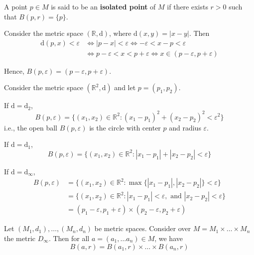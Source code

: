 \begin{definition}
	A point $p \in M$ is said to be an \textbf{isolated point} of $M$ if there exists $r > 0$ such that $B(p,r) = \{ p \}$.
\end{definition}

\begin{example}
	Consider the metric space $(\mathbb{R}, \mathrm{d})$, where $\mathrm{d}(x,y) = | x - y | $. Then
	\begin{equation*}
		\begin{aligned}
			\mathrm{d}(p,x) < \varepsilon &\iff |p-x| < \varepsilon \iff -\varepsilon < x - p < \varepsilon \\
			&\iff p - \varepsilon < x < p + \varepsilon \iff x \in (p-\varepsilon, p+\varepsilon)
		\end{aligned}
	\end{equation*}
	
	Hence, $B(p, \varepsilon) = (p - \varepsilon, p + \varepsilon)$.
\end{example}

\begin{example}
	Consider the metric space $(\mathbb{R}^2, \mathrm{d})$ and let $p = (p_1, p_2)$.
	
	If $\mathrm{d} = \mathrm{d}_2$,
	\[
		B(p, \varepsilon) = \{ (x_1, x_2) \in \mathbb{R}^2 : (x_1 - p_1)^2 + (x_2 - p_2)^2 < \varepsilon^2 \}
	\]
	i.e., the open ball $B(p, \varepsilon)$ is the circle with center $p$ and radius $\varepsilon$.
	
	If $\mathrm{d} = \mathrm{d}_1$,
	\[
		B(p, \varepsilon) = \{ (x_1, x_2) \in \mathbb{R}^2 : |x_1 - p_1| + |x_2 - p_2| < \varepsilon \}
	\]
	
	If $\mathrm{d} = \mathrm{d}_\infty$,
	\begin{equation*}
		\begin{aligned}
		B(p, \varepsilon) &= \{ (x_1, x_2) \in \mathbb{R}^2 : \max \{ |x_1 - p_1|, |x_2 - p_2| \} < \varepsilon \} \\
		&= \{ (x_1, x_2) \in \mathbb{R}^2 : |x_1 - p_1| < \varepsilon, \text{ and } |x_2 - p_2| < \varepsilon \} \\
		&= (p_1 - \varepsilon, p_1 + \varepsilon) \times (p_2 - \varepsilon, p_2 + \varepsilon)
		\end{aligned}
	\end{equation*}
\end{example}

\begin{proposition}
	Let $(M_1, d_1), \ldots, (M_n, d_n)$ be metric spaces. Consider over $M = M_1 \times \ldots \times M_n$ the metric $D_\infty$. Then for all $a = (a_1, \ldots a_n) \in M$, we have
	\[
		B(a, r) = B(a_1, r) \times \ldots \times B(a_n, r)
	\]
\end{proposition}

